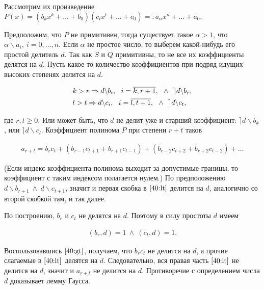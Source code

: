 \documentclass{article}
\begin{document}
Рассмотрим их произведение $P(x)=(b_k x^k+\ldots +b_0)(c_l x^l+\ldots +c_0)=:a_n x^n+\ldots +a_0.$

Предположим, что $P$ не примитивен, тогда существует такое $\alpha > 1$, что $\alpha\backslash a_i,~i=0,\ldots, n$.
Если $\alpha$ не простое число, то выберем какой-нибудь его простой делитель $d$.
Так как $S$ и $Q$ примитивны, то не все их коэффициенты делятся на $d$.
Пусть какое-то количество коэффициентов при подряд идущих высоких степенях делится на $d$.

\begin{align*}
	 & k>r \Rightarrow d\backslash b_i,~~i=\overline{k, r+1},~~\land~~
	\rceil d\backslash b_r,
	\\
	 & l>t \Rightarrow d\backslash c_i,~~i=\overline{l, t+1},~~\land~~
	\rceil d\backslash c_t,
\end{align*}

где $r, t\geq 0$. Или может быть, что $d$ не делит уже и старший коэффициент:
$\rceil d\backslash b_k$, или $\rceil d\backslash c_l$.
Коэффициент полинома $P$ при степени $r+t$  таков

\begin{align}
	a_{r+t}=b_r c_t+(b_{r-1} c_{t+1}+b_{r+1} c_{t-1})+(b_{r-2} c_{t+2}+b_{r+2} c_{t-2})+\ldots\label{40:lt}
\end{align}

(Если индекс коэффициента полинома выходит за допустимые границы, то коэффициент
с таким индексом полагается нулем.)
По предположению $d\backslash b_{r+1}~\land ~d\backslash c_{t+1}$, значит и
первая скобка в $\eqref{40:lt}$ делится на $d$, аналогично со второй скобкой там, и так далее.

По построению, $b_r$ и $c_t$ не делятся на $d$. Поэтому в силу простоты $d$ имеем

\begin{align*}
	(b_r, d) = 1~\land~(c_t, d) = 1.
\end{align*}

Воспользовавшись $\eqref{40:gt}$, получаем, что $b_r c_t$ не делится на $d$,
а прочие слагаемые в $\eqref{40:lt}$ делятся на $d$.
Следовательно, вся правая часть $\eqref{40:lt}$ не делится на $d$, значит и $a_{r+t}$ не делится на $d$. Противоречие с определением числа $d$ доказывает лемму Гаусса.
\end{document}
